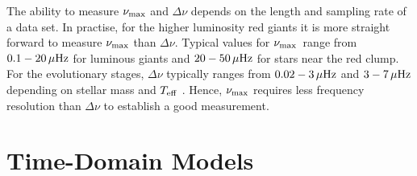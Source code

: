 \documentclass[modern]{aastex61}
\newcommand{\numax}{\mbox{$\nu_{\rm max}$}\xspace}
\newcommand{\Dnu}{\mbox{$\Delta \nu$}\xspace}
\newcommand{\teff}{\mbox{$T_{\rm eff}$}\xspace}
\newcommand{\guy}[1]{{\bf \color{blue} #1}}
\begin{document}
The ability to measure \numax and \Dnu depends on the length and sampling rate of a data set.
In practise, for the higher luminosity red giants it is more straight forward to measure \numax than \Dnu.  Typical values for \numax\ range from $0.1-20 \rm\,\mu Hz$ for luminous giants and $20-50 \rm\,\mu Hz$ for stars near the red clump.  For the evolutionary stages, \Dnu typically ranges from $0.02-3 \rm\,\mu Hz$ and $3-7 \rm\,\mu Hz$ depending on stellar mass and \teff
\citep[e.g.,][]{2011A&A...525L...9M, 2013A&A...559A.137M}.  Hence, \numax requires less frequency resolution than \Dnu to establish a good measurement.


\section{Time-Domain Models}
\end{document}
